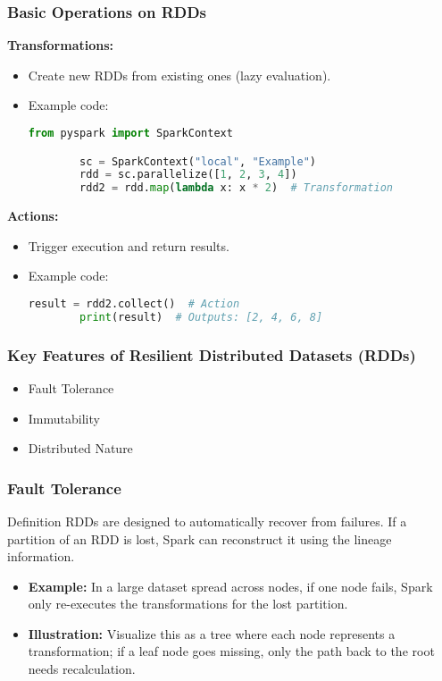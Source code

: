 \documentclass[aspectratio=169]{beamer}
\begin{document}
\begin{frame}[fragile]
    \frametitle{Basic Operations on RDDs}
    \textbf{Transformations:}
    \begin{itemize}
        \item Create new RDDs from existing ones (lazy evaluation).
        \item Example code:
        \begin{lstlisting}[language=Python]
        from pyspark import SparkContext

        sc = SparkContext("local", "Example")
        rdd = sc.parallelize([1, 2, 3, 4])
        rdd2 = rdd.map(lambda x: x * 2)  # Transformation
        \end{lstlisting}
    \end{itemize}

    \textbf{Actions:}
    \begin{itemize}
        \item Trigger execution and return results.
        \item Example code:
        \begin{lstlisting}[language=Python]
        result = rdd2.collect()  # Action
        print(result)  # Outputs: [2, 4, 6, 8]
        \end{lstlisting}
    \end{itemize}
\end{frame}

\begin{frame}[fragile]
    \frametitle{Key Features of Resilient Distributed Datasets (RDDs)}
    \begin{itemize}
        \item Fault Tolerance
        \item Immutability
        \item Distributed Nature
    \end{itemize}
\end{frame}

\begin{frame}[fragile]
    \frametitle{Fault Tolerance}
    \begin{block}{Definition}
        RDDs are designed to automatically recover from failures. If a partition of an RDD is lost, Spark can reconstruct it using the lineage information.
    \end{block}
    \begin{itemize}
        \item \textbf{Example:} In a large dataset spread across nodes, if one node fails, Spark only re-executes the transformations for the lost partition.
        \item \textbf{Illustration:} Visualize this as a tree where each node represents a transformation; if a leaf node goes missing, only the path back to the root needs recalculation.
    \end{itemize}
\end{frame}
\end{document}
